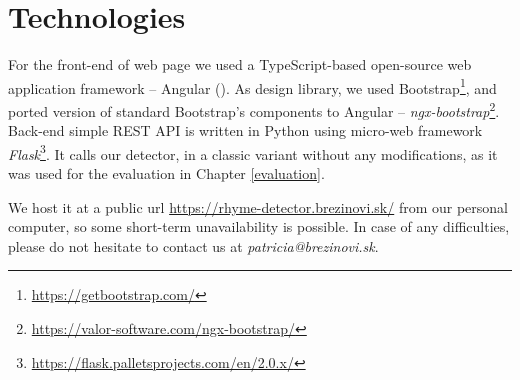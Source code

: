 \section{Technologies}
For the front-end of web page we used a TypeScript-based open-source web application framework --  Angular (\cite{angular}). As design library, we used Bootstrap\footnote{\url{https://getbootstrap.com/}}, and ported version of standard Bootstrap's components to Angular -- \textit{ngx-bootstrap}\footnote{\url{https://valor-software.com/ngx-bootstrap/}}. Back-end simple REST API is written in Python using micro-web framework \textit{Flask}\footnote{\url{https://flask.palletsprojects.com/en/2.0.x/}}. It calls our detector, in a classic variant without any modifications, as it was used for the evaluation in Chapter \ref{evaluation}. 

We host it at a public url \url{https://rhyme-detector.brezinovi.sk/} from our personal computer, so some short-term unavailability is possible. In case of any difficulties, please do not hesitate to contact us at \textit{patricia@brezinovi.sk}.